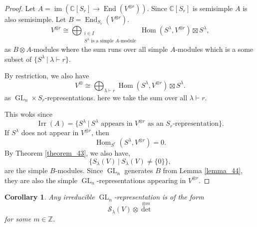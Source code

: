 \documentclass[10pt]{article}
\newtheorem{corollary}{Corollary} [section]
\numberwithin{equation}{theorem}
\DeclareMathOperator{\End}{End}
\DeclareMathOperator{\Irr}{Irr}
\DeclareMathOperator{\GL}{GL}
\DeclareMathOperator{\Hom}{Hom}
\DeclareMathOperator{\Image}{im}
\newcommand{\Z}[0]{\mathbb{Z}}
\newcommand{\C}[0]{\mathbb{C}}
\newcommand{\sep}[0]{\:|\:}
\begin{document}
\begin{proof}
  Let $A = \Image(\C[S_r]\to\End(V^{\otimes r}))$. Since $\C[S_r]$ is semisimple $A$ is also semisimple. Let $B = \End_{S_r}(V^{\otimes r})$.
  \begin{equation*}
    V^{\otimes r} \cong \bigoplus_{\substack{i\in I\\\text{$S^\lambda$ is a simple $A$-module}}}\Hom(S^\lambda,V^{\otimes r})\boxtimes S^\lambda,
  \end{equation*}
  as $B\otimes A$-modules where the sum runs over all simple $A$-modules which is a some subset of $\{S^\lambda\sep \lambda\vdash r\}$. \\
  \par By restriction, we also have
  \begin{equation*}
    V^{\otimes}\cong \bigoplus_{\lambda\vdash r}\Hom(S^\lambda,V^{\otimes r})\boxtimes S^{\lambda}.
  \end{equation*} 
  as $\GL_n\times S_r$-representations. here we take the sum over all $\lambda\vdash r$.\\
  \par This woks since 
  \begin{equation*}
    \Irr(A) = \{S^\lambda\sep \text{$S^\lambda$ appears in $V^{\otimes r}$ as an $S_r$-representation}\}.
  \end{equation*}
  If $S^\lambda$ does not appear in $V^{\otimes r}$, then
  \begin{equation*}
    \Hom_{S^r}(S^\lambda,V^{\otimes r}) = 0.
  \end{equation*}
  By Theorem \ref{theorem_43}, we also have,
  \begin{equation*}
    \{S_\lambda(V)\sep S_\lambda(V) \not=\{0\}\},
  \end{equation*}
  are the simple $B$-modules. Since $\GL_n$ generates $B$ from Lemma \ref{lemma_44}, they are also the simple $\GL_n$-representations appearing in $V^{\otimes r}$.
\end{proof}
\begin{corollary}
  \label{corollary_45}
  Any irreducible $\GL_n$-representation is of the form
  \begin{equation*}
    \mathcal{S}_\lambda(V)\otimes \det^{\otimes m}
  \end{equation*}
  for some $m\in\Z$.
\end{corollary}
\end{document}
